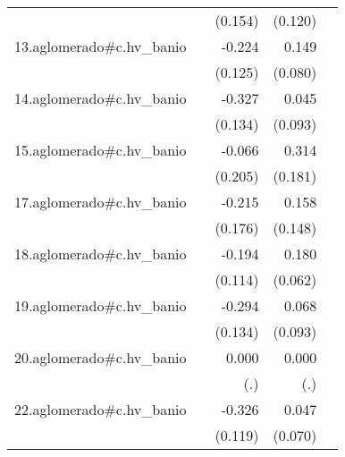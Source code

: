 {\begin{longtable}{l*{4}{D{.}{.}{-1}}}
            &                     &     (0.154)         &     (0.120)         &                     \\
\addlinespace
13.aglomerado#c.hv\_banio&                     &      -0.224         &       0.149         &                     \\
            &                     &     (0.125)         &     (0.080)         &                     \\
\addlinespace
14.aglomerado#c.hv\_banio&                     &      -0.327\sym{*}  &       0.045         &                     \\
            &                     &     (0.134)         &     (0.093)         &                     \\
\addlinespace
15.aglomerado#c.hv\_banio&                     &      -0.066         &       0.314         &                     \\
            &                     &     (0.205)         &     (0.181)         &                     \\
\addlinespace
17.aglomerado#c.hv\_banio&                     &      -0.215         &       0.158         &                     \\
            &                     &     (0.176)         &     (0.148)         &                     \\
\addlinespace
18.aglomerado#c.hv\_banio&                     &      -0.194         &       0.180\sym{**} &                     \\
            &                     &     (0.114)         &     (0.062)         &                     \\
\addlinespace
19.aglomerado#c.hv\_banio&                     &      -0.294\sym{*}  &       0.068         &                     \\
            &                     &     (0.134)         &     (0.093)         &                     \\
\addlinespace
20.aglomerado#c.hv\_banio&                     &       0.000         &       0.000         &                     \\
            &                     &         (.)         &         (.)         &                     \\
\addlinespace
22.aglomerado#c.hv\_banio&                     &      -0.326\sym{**} &       0.047         &                     \\
            &                     &     (0.119)         &     (0.070)         &                     \\

\end{longtable}}

